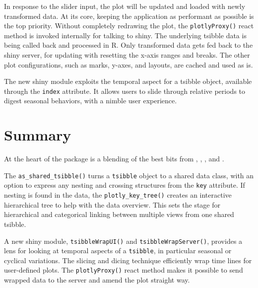In response to the slider input, the plot will be updated and loaded
with newly transformed data. At its core, keeping the application as
performant as possible is the top priority. Without completely redrawing
the plot, the \texttt{plotlyProxy()} react method is invoked internally
for talking to shiny. The underlying tsibble data is being called back
and processed in R. Only transformed data gets fed back to the shiny
server, for updating with resetting the x-axis ranges and breaks. The
other plot configurations, such as marks, y-axes, and layouts, are
cached and used as is.

The new shiny module exploits the temporal aspect for a tsibble object,
available through the \texttt{index} attribute. It allows users to slide
through relative periods to digest seasonal behaviors, with a nimble
user experience.

\hypertarget{summary}{%
\section{Summary}\label{summary}}

At the heart of the  package is a blending of the
best bits from , , ,
and .

The \texttt{as\_shared\_tsibble()} turns a \texttt{tsibble} object to a
shared data class, with an option to express any nesting and crossing
structures from the \texttt{key} attribute. If nesting is found in the
data, the \texttt{plotly\_key\_tree()} creates an interactive
hierarchical tree to help with the data overview. This sets the stage
for hierarchical and categorical linking between multiple views from one
shared tsibble.

A new shiny module, \texttt{tsibbleWrapUI()} and
\texttt{tsibbleWrapServer()}, provides a lens for looking at temporal
aspects of a \texttt{tsibble}, in particular seasonal or cyclical
variations. The slicing and dicing technique efficiently wrap time lines
for user-defined plots. The \texttt{plotlyProxy()} react method makes it
possible to send wrapped data to the server and amend the plot straight
way.



\address{%
Earo Wang\\
The University of Auckland\\%
Department of
Statistics\\ \href{mailto:earo.wang@auckland.ac.nz}{\texttt{earo.wang@auckland.ac.nz}}\\
%
%
%
%
}

\address{%
Dianne Cook\\
Monash University\\%
Department of Econometrics and Business
Statistics\\ \href{mailto:dicook@monash.edu}{\texttt{dicook@monash.edu}}\\
%
%
%
%
}
